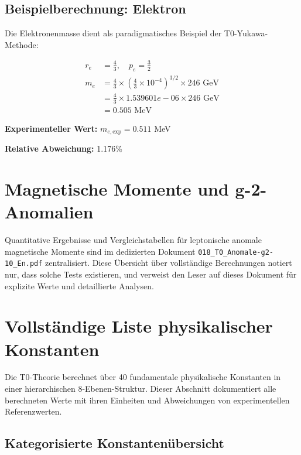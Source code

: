 	\subsection{Beispielberechnung: Elektron}
	
	Die Elektronenmasse dient als paradigmatisches Beispiel der T0-Yukawa-Methode:
	
	\begin{align}
		r_e &= \frac{4}{3}, \quad p_e = \frac{3}{2} \\
		m_e &= \frac{4}{3} \times \left(\frac{4}{3} \times 10^{-4}\right)^{3/2} \times 246 \text{ GeV} \\
		&= \frac{4}{3} \times 1.539601e-06 \times 246 \text{ GeV} \\
		&= 0.505 \text{ MeV}
	\end{align}
	
	\textbf{Experimenteller Wert:} $m_{e,\text{exp}} = 0.511$ MeV
	
	\textbf{Relative Abweichung:} 1.176\%
	
	\section{Magnetische Momente und g-2-Anomalien}
	
	Quantitative Ergebnisse und Vergleichstabellen für leptonische anomale magnetische Momente sind
	im dedizierten Dokument \texttt{018\_T0\_Anomale-g2-10\_En.pdf} zentralisiert.
	Diese Übersicht über vollständige Berechnungen notiert nur, dass solche Tests existieren, und verweist den Leser
	auf dieses Dokument für explizite Werte und detaillierte Analysen.
	
	\section{Vollständige Liste physikalischer Konstanten}
	
	Die T0-Theorie berechnet über 40 fundamentale physikalische Konstanten in einer hierarchischen 8-Ebenen-Struktur. Dieser Abschnitt dokumentiert alle berechneten Werte mit ihren Einheiten und Abweichungen von experimentellen Referenzwerten.
	
	\subsection{Kategorisierte Konstantenübersicht}
	
